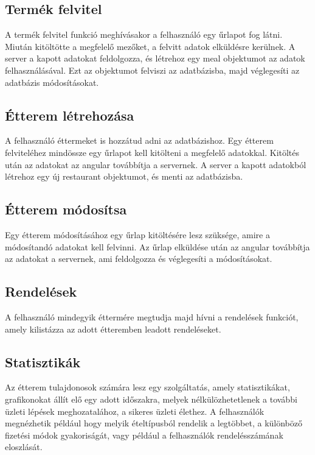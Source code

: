 \subsection{Termék felvitel}

A termék felvitel funkció meghívásakor a felhasználó egy űrlapot fog látni. Miután kitöltötte a megfelelő mezőket, a felvitt adatok elküldésre kerülnek. A server a kapott adatokat feldolgozza, és létrehoz egy meal objektumot az adatok felhasználásával. Ezt az objektumot felviszi az adatbázisba, majd véglegesíti az adatbázis módosításokat.

\subsection{Étterem létrehozása}

A felhasználó éttermeket is hozzátud adni az adatbázishoz. Egy étterem felviteléhez mindössze egy űrlapot kell kitölteni a megfelelő adatokkal. Kitöltés után az adatokat az angular továbbítja a servernek. A server a kapott adatokból létrehoz egy új restaurant objektumot, és menti az adatbázisba.

\subsection{Étterem módosítsa}

Egy étterem módosításához egy űrlap kitöltésére lesz szüksége, amire a módosítandó adatokat kell felvinni. Az űrlap elküldése után az angular továbbítja az adatokat a servernek, ami feldolgozza és véglegesíti a módosításokat.

\subsection{Rendelések}

A felhasználó mindegyik éttermére megtudja majd hívni a rendelések funkciót, amely kilistázza az adott étteremben leadott rendeléseket.

\subsection{Statisztikák}

Az étterem tulajdonosok számára lesz egy szolgáltatás, amely statisztikákat, grafikonokat állít elő egy adott időszakra, melyek nélkülözhetetlenek a további üzleti lépések meghozatalához, a sikeres üzleti élethez. A felhasználók megnézhetik például hogy melyik ételtípusból rendelik a legtöbbet, a különböző fizetési módok gyakoriságát, vagy például a felhasználók rendelésszámának eloszlását.
